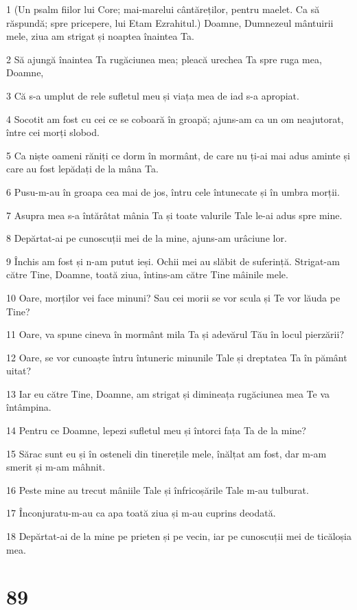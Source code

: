 \par 1 (Un psalm fiilor lui Core; mai-marelui cântăreților, pentru maelet. Ca să răspundă; spre pricepere, lui Etam Ezrahitul.) Doamne, Dumnezeul mântuirii mele, ziua am strigat și noaptea înaintea Ta.
\par 2 Să ajungă înaintea Ta rugăciunea mea; pleacă urechea Ta spre ruga mea, Doamne,
\par 3 Că s-a umplut de rele sufletul meu și viața mea de iad s-a apropiat.
\par 4 Socotit am fost cu cei ce se coboară în groapă; ajuns-am ca un om neajutorat, între cei morți slobod.
\par 5 Ca niște oameni răniți ce dorm în mormânt, de care nu ți-ai mai adus aminte și care au fost lepădați de la mâna Ta.
\par 6 Pusu-m-au în groapa cea mai de jos, întru cele întunecate și în umbra morții.
\par 7 Asupra mea s-a întărâtat mânia Ta și toate valurile Tale le-ai adus spre mine.
\par 8 Depărtat-ai pe cunoscuții mei de la mine, ajuns-am urâciune lor.
\par 9 Închis am fost și n-am putut ieși. Ochii mei au slăbit de suferință. Strigat-am către Tine, Doamne, toată ziua, întins-am către Tine mâinile mele.
\par 10 Oare, morților vei face minuni? Sau cei morii se vor scula și Te vor lăuda pe Tine?
\par 11 Oare, va spune cineva în mormânt mila Ta și adevărul Tău în locul pierzării?
\par 12 Oare, se vor cunoaște întru întuneric minunile Tale și dreptatea Ta în pământ uitat?
\par 13 Iar eu către Tine, Doamne, am strigat și dimineața rugăciunea mea Te va întâmpina.
\par 14 Pentru ce Doamne, lepezi sufletul meu și întorci fața Ta de la mine?
\par 15 Sărac sunt eu și în osteneli din tinerețile mele, înălțat am fost, dar m-am smerit și m-am mâhnit.
\par 16 Peste mine au trecut mâniile Tale și înfricoșările Tale m-au tulburat.
\par 17 Înconjuratu-m-au ca apa toată ziua și m-au cuprins deodată.
\par 18 Depărtat-ai de la mine pe prieten și pe vecin, iar pe cunoscuții mei de ticăloșia mea.

\chapter{89}

